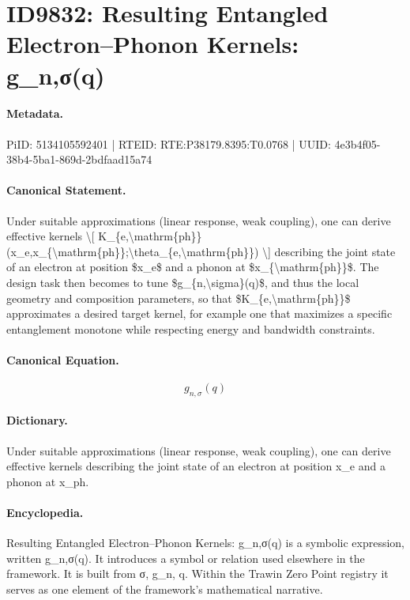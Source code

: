 \section*{ID9832: Resulting Entangled Electron–Phonon Kernels: g\_n,σ(q)}
\paragraph{Metadata.}
PiID: 5134105592401 | RTEID: RTE:P38179.8395:T0.0768 | UUID: 4e3b4f05-38b4-5ba1-869d-2bdfaad15a74

\paragraph{Canonical Statement.}
Under suitable approximations (linear response, weak coupling), one can derive effective kernels \textbackslash{}[ K\_\{e,\textbackslash{}mathrm\{ph\}\}(x\_e,x\_\{\textbackslash{}mathrm\{ph\}\};\textbackslash{}theta\_\{e,\textbackslash{}mathrm\{ph\}\}) \textbackslash{}] describing the joint state of an electron at position \$x\_e\$ and a phonon at \$x\_\{\textbackslash{}mathrm\{ph\}\}\$. The design task then becomes to tune \$g\_\{n,\textbackslash{}sigma\}(q)\$, and thus the local geometry and composition parameters, so that \$K\_\{e,\textbackslash{}mathrm\{ph\}\}\$ approximates a desired target kernel, for example one that maximizes a specific entanglement monotone while respecting energy and bandwidth constraints.

\paragraph{Canonical Equation.}
\[
g_{n,\sigma}(q)
\]

\paragraph{Dictionary.}
Under suitable approximations (linear response, weak coupling), one can derive effective kernels describing the joint state of an electron at position x\_e and a phonon at x\_ph.

\paragraph{Encyclopedia.}
Resulting Entangled Electron–Phonon Kernels: g\_n,σ(q) is a symbolic expression, written g\_n,σ(q). It introduces a symbol or relation used elsewhere in the framework. It is built from σ, g\_n, q. Within the Trawin Zero Point registry it serves as one element of the framework's mathematical narrative.
